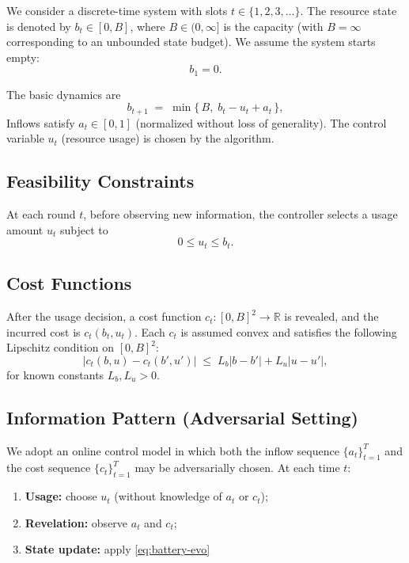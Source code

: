 \documentclass[11pt]{article}
\begin{document}
We consider a discrete-time system with slots \(t \in \{1,2,3,\dots\}\).  
The resource state is denoted by \(b_t \in [0,B]\), where \(B \in (0,\infty]\) is the capacity (with \(B=\infty\) corresponding to an unbounded state budget).
We assume the system starts empty:
\[
b_1 = 0.
\]

The basic dynamics are
\begin{equation}
\label{eq:battery-evo}
b_{t+1} \;=\; \min\{\,B,\; b_t - u_t + a_t\,\},
\end{equation}
Inflows satisfy \(a_t \in [0,1]\) (normalized without loss of generality).
The control variable \(u_t\) (resource usage) is chosen by the algorithm.

\subsection{Feasibility Constraints}
At each round \(t\), before observing new information, the controller selects a usage amount \(u_t\) subject to
\[
0 \le u_t \le b_t .
\]

\subsection{Cost Functions}
After the usage decision, a cost function \(c_t : [0,B]^2 \to \mathbb{R}\) is revealed, and the incurred cost is \(c_t(b_t,u_t)\).  
Each \(c_t\) is assumed convex and satisfies the following Lipschitz condition on \([0,B]^2\):
\begin{equation}
\label{eq:Lip}
|c_t(b,u) - c_t(b',u')|
\;\leq\;
L_b |b-b'| + L_u |u-u'|,
\end{equation}
for known constants \(L_b,L_u > 0\).

\subsection{Information Pattern (Adversarial Setting)}
We adopt an online control model in which both the inflow sequence \(\{a_t\}_{t=1}^T\) and the cost sequence \(\{c_t\}_{t=1}^T\) may be adversarially chosen.
At each time \(t\):
\begin{enumerate}
    \item \textbf{Usage:} choose \(u_t\) (without knowledge of \(a_t\) or \(c_t\));
    \item \textbf{Revelation:} observe \(a_t\) and \(c_t\);
    \item \textbf{State update:} apply \eqref{eq:battery-evo} 
\end{enumerate}
\end{document}
